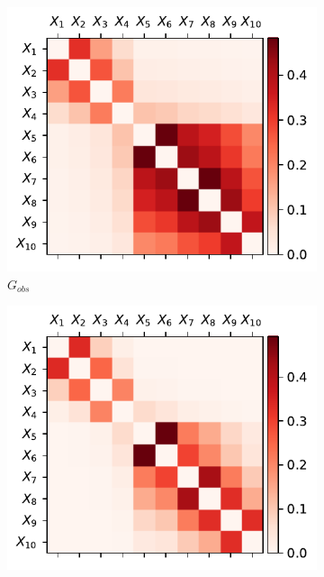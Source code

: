 \documentclass[../Thesis.tex]{subfiles}
\begin{document}
\begin{figure}[H]
    \centering
    \begin{subfigure}[t]{0.49\textwidth}
        \centering
        \includegraphics[width=.95\linewidth]{figures/Gaussian Chain Theoretical/symmetric G obs.pdf}
        \caption{$G_{obs}$}
    \end{subfigure}
    \hfill
    \begin{subfigure}[t]{0.49\textwidth}
        \centering
        \includegraphics[width=.95\linewidth]{figures/Gaussian Chain Theoretical/G dir from symmetric G obs.pdf}

\end{subfigure}
\end{figure}
\end{document}
